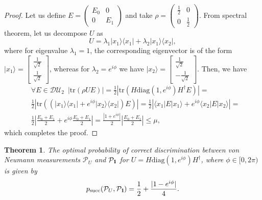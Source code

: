 \documentclass[preprint,12pt, a4paper]{elsarticle}
\newcommand{\ket}[1]{\ensuremath{|#1\rangle}}
\newcommand{\bra}[1]{\ensuremath{\langle#1|}}
\newcommand{\ketbra}[2]{\ensuremath{\ket{#1}\bra{#2}}}
\newcommand{\proj}[1]{\ensuremath{\ketbra{#1}{#1}}}
\newcommand{\1}{{\rm 1\hspace{-0.9mm}l}}
\newcommand{\Id}{{\rm 1\hspace{-0.9mm}l}}
\newcommand{\PP}{\mathcal{P}}
\newcommand{\diaguni}{\ensuremath{\mathcal{DU}}}
\newcommand{\diag}{\mathrm{diag}}
\newcommand{\tr}{\mathrm{tr}}
\newtheorem{theorem}{Theorem}
\begin{document}
\begin{proof}
	
	Let us define $E = \left(\begin{array}{cc}E_0&0\\0&E_1\end{array}\right)  $ 
	and take $\rho = 
	\left(\begin{array}{cc}\frac{1}{2}&0\\0&\frac{1}{2}\end{array}\right) $. 
	From spectral theorem, let us decompose $U$ as
	\begin{equation}
	U= \lambda_1 \ketbra{x_1}{x_1} + \lambda_2 \ketbra{x_1}{x_2}, 
	\end{equation}
	where  for eigenvalue $\lambda_1 = 1$, the corresponding 
	eigenvector is 
	of the form $\ket{x_1} = \left[\begin{array}{c}\frac{1}{\sqrt{2}}\\\frac{1}{\sqrt{2}}\end{array}\right]
	$,
	whereas for  $\lambda_2 = e^{i \phi}$ we have $\ket{x_2} = \left[\begin{array}{c}\frac{1}{\sqrt{2}}\\-\frac{1}{\sqrt{2}}\end{array}\right] 
	$.
	Then, we have 
	\begin{equation}
	\begin{split}
	& \forall E \in \diaguni_2 \,\,\, | \tr (\rho U E) | = \frac{1}{2}  \left| \tr \left(
	H \diag(1, e^{i\phi}) H^\dagger E \right) \right| =  \\ &
	\frac{1}{2} \left| \tr\left((   \proj{x_1} +e^{i \phi}\proj{x_2} ) E \right) 
	\right|  = 
	\frac{1}{2} \left|  \bra{x_1} E \ket{x_1} +  e^{i \phi}\bra{x_2} E \ket{x_2} 
	\right| = \\& 
	\frac{1}{2} \left| \frac{E_0 + E_1}{2} + e^{i \phi } \frac{E_0+E_1}{2} \right| 
	= 
	\frac{\left| 1+ e^{i \phi } \right|}{2} \left| \frac{E_0 + E_1}{2} \right| \le 
	\mu, 
	\end{split}
	\end{equation}
	which completes the proof.
\end{proof}
\begin{theorem}
The optimal probability of correct discrimination between von Neumann
measurements $\PP_U$ and $\PP_{\Id}$ for $U = H \diag(1, e^{i \phi}) H^\dagger$,
where $\phi \in [0, 2\pi)$ is given by
\begin{equation}
p_{\text{succ}}(\PP_{U}, \PP_{\Id}) = \frac{1}{2} + \frac{|1 - e^{i \phi}  |}{4} . 
\end{equation}
\end{theorem}
\end{document}
